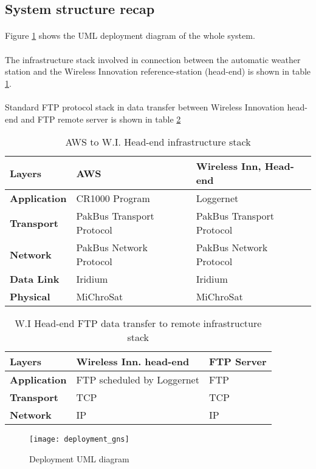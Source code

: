 \subsection{System structure recap}
\paragraph{}
Figure \ref{fig:depdiag} shows the UML deployment diagram of the whole system.
\paragraph{}
The infrastructure stack involved in connection between the automatic weather station and the Wireless Innovation reference-station (head-end) is shown in table \ref{stack1}. 
\paragraph{}
Standard FTP protocol stack in data transfer between Wireless Innovation head-end and FTP remote server is shown in table \ref{stack2}
\begin{table}[]
\centering
\begin{tabular}{|l|l|l|}
\hline
Layers            & \textbf{AWS}              & \textbf{Wireless Inn, Head-end} \\ \hline
\textbf{Application} & CR1000 Program            & Loggernet                      \\ \hline
\textbf{Transport}   & PakBus Transport Protocol & PakBus Transport Protocol      \\ \hline
\textbf{Network}     & PakBus Network Protocol   & PakBus Network Protocol        \\ \hline
\textbf{Data Link}   & Iridium                   & Iridium                        \\ \hline
\textbf{Physical}    & MiChroSat                 & MiChroSat                      \\ \hline
\end{tabular}
\caption{AWS to W.I. Head-end infrastructure stack}
\label{stack1}
\end{table}

\begin{table}[]
\centering
\begin{tabular}{|l|l|l|}
\hline
Layers           & \textbf{Wireless Inn. head-end} & \textbf{FTP Server} \\ \hline
\textbf{Application} & FTP scheduled by Loggernet     & FTP                 \\ \hline
\textbf{Transport}   & TCP                            & TCP                 \\ \hline
\textbf{Network}     & IP                             & IP                  \\ \hline
\end{tabular}
\caption{W.I Head-end FTP data transfer to remote infrastructure stack}
\label{stack2}
\end{table}

\begin{figure}
	\centering
	\texttt{[image: deployment\_gns]}
	\caption{Deployment UML diagram}
	\label{fig:depdiag}
\end{figure}